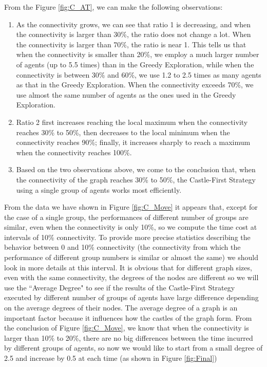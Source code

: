 From the Figure \ref{fig:C_AT}, we can make  the following observations:
\begin{enumerate}
\item As the connectivity grows, we can see that ratio 1 is decreasing, and when the connectivity is larger than 30\%, the ratio does not change a lot. When the connectivity is larger than 70\%, the ratio is near 1.
This tells us that when the connectivity is smaller than 20\%, we employ a much larger number of   agents (up to 5.5 times) than in the {\sc Greedy} Exploration,  while when the connectivity is between 30\% and  60\%, we use 1.2 to 2.5 times as many agents as that in the {\sc Greedy} Exploration. When the connectivity exceeds 70\%, we use almost the same number of agents as the ones used in the {\sc Greedy} Exploration.
\item Ratio 2 first increases reaching the local maximum when the connectivity reaches 30\% to 50\%, then decreases to the local minimum when the connectivity reaches 90\%; finally, it increases sharply to reach a maximum when the connectivity reaches 100\%.
\item Based on the two observations above, we come to the conclusion that, when the connectivity of the graph reaches 30\% to 50\%, the {\sc Castle-First} Strategy using a single group of agents works most efficiently.
\end{enumerate}

From the data we have shown in Figure \ref{fig:C_Move}   it appears that, except for the case of a single group,
the performances of different number of groups are similar,  even when the connectivity is only 10\%, so we compute the time cost at intervals of  10\% connectivity. 
To provide more precise statistics describing 
the behavior between 0 and   10\% connectivity (the connectivity from which the performance of different group numbers is similar or almost the same) we should look in more details at this interval.
It is obvious that for different graph sizes, even with the same connectivity, the degrees of the nodes are different so we  will use the   ``Average Degree"   to see if the results of the {\sc Castle-First} Strategy executed by different number of groups of agents have large difference depending on the average degrees of their nodes. The average degree of a graph is an important factor because it influences how the castles of the graph form. From the conclusion of Figure \ref{fig:C_Move}, we know that when the connectivity is larger than 10\% to 20\%, there are no big differences between   the time incurred by different groups of agents, so now we would like to start from a small degree of 2.5 and increase by 0.5  at each  time (as shown in Figure \ref{fig:Final})

